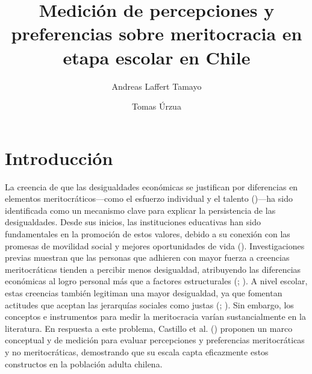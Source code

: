 \documentclass[
  12pt,
]{article}
\title{Medición de percepciones y preferencias sobre meritocracia en
etapa escolar en Chile}
\author{Andreas Laffert Tamayo}
\affil{%
                  Instituto de Sociología, Pontificia Universidad
                  Católica de Chile
              }
\author{Tomas Úrzua}
\affil{%
                  Departamento de Sociología, Universidad de Chile
              }
\date{}
\begin{document}
\maketitle

\section{Introducción}\label{introducciuxf3n}

La creencia de que las desigualdades económicas se justifican por
diferencias en elementos meritocráticos---como el esfuerzo individual y
el talento ()---ha sido
identificada como un mecanismo clave para explicar la persistencia de
las desigualdades. Desde sus inicios, las instituciones educativas han
sido fundamentales en la promoción de estos valores, debido a su
conexión con las promesas de movilidad social y mejores oportunidades de
vida (). Investigaciones
previas muestran que las personas que adhieren con mayor fuerza a
creencias meritocráticas tienden a percibir menos desigualdad,
atribuyendo las diferencias económicas al logro personal más que a
factores estructurales (;
). A nivel escolar, estas
creencias también legitiman una mayor desigualdad, ya que fomentan
actitudes que aceptan las jerarquías sociales como justas
(;
). Sin
embargo, los conceptos e instrumentos para medir la meritocracia varían
sustancialmente en la literatura. En respuesta a este problema, Castillo
et al. () proponen un
marco conceptual y de medición para evaluar percepciones y preferencias
meritocráticas y no meritocráticas, demostrando que su escala capta
eficazmente estos constructos en la población adulta chilena.
\end{document}
